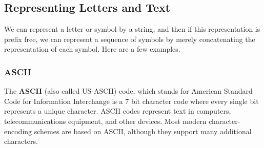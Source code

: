 \documentclass[a4paper, 12pt]{report}
\theoremstyle{remark}
\theoremstyle{definition}
\begin{document}
\subsection{Representing Letters and Text}
We can represent a letter or symbol by a string, and then if this representation is prefix free, we can represent a sequence of symbols by merely concatenating the representation of each symbol. Here are a few examples. 

\subsubsection{ASCII}

The \textbf{ASCII} (also called US-ASCII) code, which stands for American Standard Code for Information Interchange is a $7$ bit character code where every single bit represents a unique character. ASCII codes represent text in computers, telecommunications equipment, and other devices. Most modern character-encoding schemes are based on ASCII, although they support many additional characters.
\end{document}
